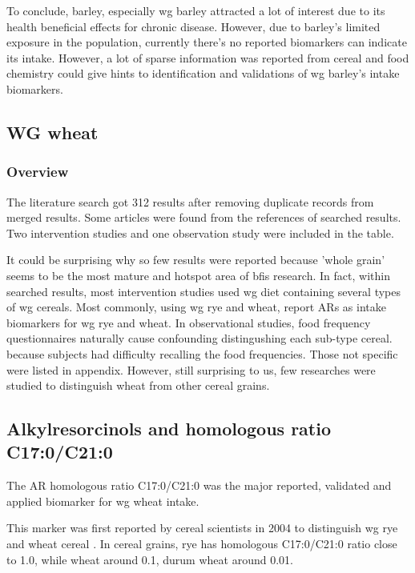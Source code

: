 To conclude, barley, especially \acrshort{wg} barley attracted a lot of interest due to its health beneficial effects for chronic disease. However, due to barley's limited exposure in the population, currently there's no reported biomarkers can indicate its intake. However, a lot of sparse information was reported from cereal and food chemistry could give hints to identification and validations of \acrshort{wg} barley's intake biomarkers.

\subsection{WG wheat}
\subsubsection{Overview}
The literature search got 312 results after removing duplicate records from merged results. Some articles were found from the references of searched results. Two intervention studies and one observation study were included in the table. 

It could be surprising why so few results were reported because 'whole grain' seems to be the most mature and hotspot area of \acrshort{bfis} research. 
In fact, within searched results, most intervention studies used \acrshort{wg} diet containing several types of \acrshort{wg} cereals. Most commonly, using \acrshort{wg} rye and wheat, report ARs as intake biomarkers for \acrshort{wg} rye and wheat.
In observational studies, food frequency questionnaires naturally cause confounding distingushing each sub-type cereal. because subjects had difficulty recalling the food frequencies.
Those not specific were listed in appendix. 
However, still surprising to us, few researches were studied to distinguish wheat from other cereal grains.



\subsection{Alkylresorcinols and homologous ratio C17:0/C21:0}
The AR homologous ratio C17:0/C21:0 was the major reported, validated and applied biomarker for \acrshort{wg} wheat intake. 

This marker was first reported by cereal scientists in 2004 to distinguish \acrshort{wg} rye and wheat cereal \cite{Chen2004}. In cereal grains, rye has homologous C17:0/C21:0 ratio close to 1.0, while wheat around 0.1, durum wheat around 0.01.

